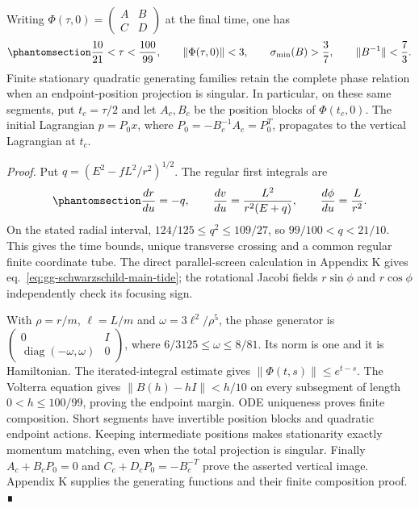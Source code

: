 \documentclass[
  english,
  11pt,
  reqno]{amsart}
\newcommand{\C}{\mathbb{C}}
\begin{document}
Writing
\(\Phi(\tau,0)=\left(\begin{smallmatrix}A&B\\C&D\end{smallmatrix}\right)\)
at the final time, one has
\begin{equation}\protect\phantomsection\label{eq:gg-schwarzschild-main-transfer-margin}{
 \frac{10}{21}<\tau<\frac{100}{99},\qquad
 \|\Phi(\tau,0)\|<3,\qquad
 \sigma_{\min}(B)>\frac37,\qquad \|B^{-1}\|<\frac73.
}\end{equation} Finite stationary quadratic generating families retain
the complete phase relation when an endpoint-position projection is
singular. In particular, on these same segments, put \(t_c=\tau/2\) and
let \(A_c,B_c\) be the position blocks of \(\Phi(t_c,0)\). The initial
Lagrangian \(p=P_0x\), where \(P_0=-B_c^{-1}A_c=P_0^T\), propagates to
the vertical Lagrangian at \(t_c\).

\emph{Proof.} Put \(q=(E^2-fL^2/r^2)^{1/2}\). The regular first
integrals are
\begin{equation}\protect\phantomsection\label{eq:gg-schwarzschild-main-first-integrals}{
 \frac{dr}{du}=-q,\qquad
 \frac{dv}{du}=\frac{L^2}{r^2(E+q)},\qquad
 \frac{d\phi}{du}=\frac L{r^2}.
}\end{equation} On the stated radial interval,
\(124/125\le q^2\le109/27\), so \(99/100<q<21/10\). This gives the time
bounds, unique transverse crossing and a common regular finite
coordinate tube. The direct parallel-screen calculation in Appendix K
gives eq.~\ref{eq:gg-schwarzschild-main-tide}; the rotational Jacobi
fields \(r\sin\phi\) and \(r\cos\phi\) independently check its focusing
sign.

With \(\rho=r/m\), \(\ell=L/m\) and \(\omega=3\ell^2/\rho^5\), the phase
generator is
\(\left(\begin{smallmatrix}0&I\\\operatorname{diag}(-\omega,\omega)&0\end{smallmatrix}\right)\),
where \(6/3125\le\omega\le8/81\). Its norm is one and it is Hamiltonian.
The iterated-integral estimate gives \(\|\Phi(t,s)\|\le e^{t-s}\). The
Volterra equation gives \(\|B(h)-hI\|<h/10\) on every subsegment of
length \(0<h\le100/99\), proving the endpoint margin. ODE uniqueness
proves finite composition. Short segments have invertible position
blocks and quadratic endpoint actions. Keeping intermediate positions
makes stationarity exactly momentum matching, even when the total
projection is singular. Finally \(A_c+B_cP_0=0\) and
\(C_c+D_cP_0=-B_c^{-T}\) prove the asserted vertical image. Appendix K
supplies the generating functions and their finite composition proof. ∎
\end{document}
